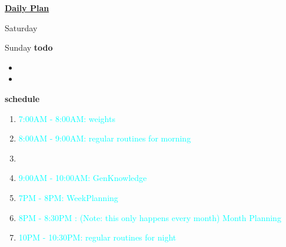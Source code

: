 \documentclass[serif,mathserif,final]{beamer}
\newcommand{\regItem}[1]{\item \textcolor{cyan}{#1}}
\begin{document}
\begin{frame}{}
\begin{columns}[t]
\begin{column}{0.27\linewidth}{\textbf{\underline{Daily Plan}}}
{\begin{block}{\small Saturday }
\end{block} 

\begin{block}{\small Sunday } 
  \textbf{todo} 
  \begin{itemize} 
  \item \tiny 
  \item \tiny
  \end{itemize} 

  \textbf{schedule} 
  \begin{enumerate} 
    \regItem{7:00AM - 8:00AM: weights}
    \regItem{8:00AM - 9:00AM: regular routines for morning}
  \item \tiny    
    \regItem{9:00AM - 10:00AM: GenKnowledge} 

    \regItem{7PM - 8PM: WeekPlanning} 
    \regItem{8PM - 8:30PM : (Note: this only happens every month) Month Planning} 
    
    \regItem{10PM  - 10:30PM: regular routines for night}
  \end{enumerate} 
  
\end{block} 

} %



\end{column}
\end{columns}
\end{frame}
\end{document}
